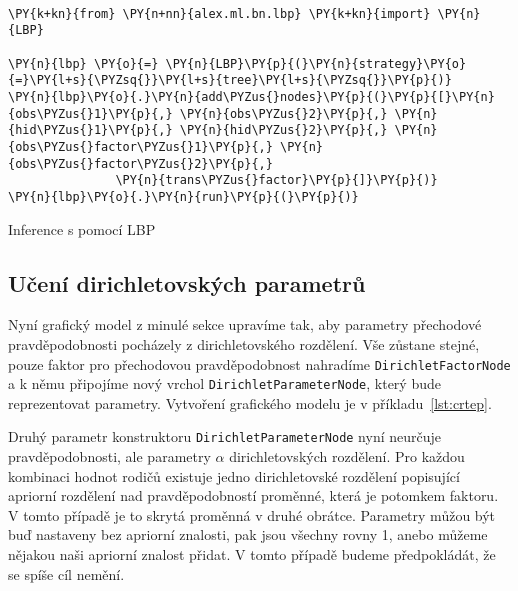 \begin{example}
\begin{Verbatim}[commandchars=\\\{\}]

\PY{k+kn}{from} \PY{n+nn}{alex.ml.bn.lbp} \PY{k+kn}{import} \PY{n}{LBP}

\PY{n}{lbp} \PY{o}{=} \PY{n}{LBP}\PY{p}{(}\PY{n}{strategy}\PY{o}{=}\PY{l+s}{\PYZsq{}}\PY{l+s}{tree}\PY{l+s}{\PYZsq{}}\PY{p}{)}
\PY{n}{lbp}\PY{o}{.}\PY{n}{add\PYZus{}nodes}\PY{p}{(}\PY{p}{[}\PY{n}{obs\PYZus{}1}\PY{p}{,} \PY{n}{obs\PYZus{}2}\PY{p}{,} \PY{n}{hid\PYZus{}1}\PY{p}{,} \PY{n}{hid\PYZus{}2}\PY{p}{,} \PY{n}{obs\PYZus{}factor\PYZus{}1}\PY{p}{,} \PY{n}{obs\PYZus{}factor\PYZus{}2}\PY{p}{,}
               \PY{n}{trans\PYZus{}factor}\PY{p}{]}\PY{p}{)}
\PY{n}{lbp}\PY{o}{.}\PY{n}{run}\PY{p}{(}\PY{p}{)}
\end{Verbatim}
\caption{Inference s pomocí LBP}
\label{lst:lbpex}
\end{example}

%

\subsection{Učení dirichletovských parametrů}

Nyní grafický model z minulé sekce upravíme tak, aby parametry přechodové pravděpodobnosti pocházely z dirichletovského rozdělení.
Vše zůstane stejné, pouze faktor pro přechodovou pravděpodobnost nahradíme \texttt{DirichletFactorNode} a k němu připojíme nový vrchol \texttt{DirichletParameterNode}, který bude reprezentovat parametry.
Vytvoření grafického modelu je v příkladu~\ref{lst:crtep}.

Druhý parametr konstruktoru \texttt{DirichletParameterNode} nyní neurčuje pravděpodobnosti, ale parametry $\alpha$ dirichletovských rozdělení.
Pro každou kombinaci hodnot rodičů existuje jedno dirichletovské rozdělení popisující apriorní rozdělení nad pravděpodobností proměnné, která je potomkem faktoru.
V tomto případě je to skrytá proměnná v druhé obrátce.
Parametry můžou být buď nastaveny bez apriorní znalosti, pak jsou všechny rovny 1, anebo můžeme nějakou naši apriorní znalost přidat.
V tomto případě budeme předpokládát, že se spíše cíl nemění.

